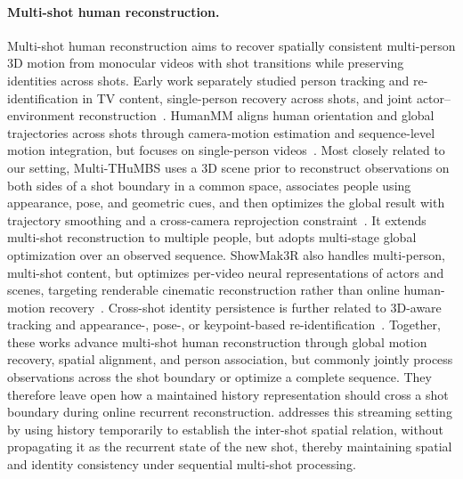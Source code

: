 \paragraph{Multi-shot human reconstruction.}
Multi-shot human reconstruction aims to recover spatially consistent
multi-person 3D motion from monocular videos with shot transitions while
preserving identities across shots. Early work separately studied person
tracking and re-identification in TV content, single-person recovery across
shots, and joint actor--environment
reconstruction~\citep{pavlakos2022tvtracking,pavlakos2022multishot,pavlakos2022tvreconstruction}.
HumanMM aligns human orientation and global trajectories across shots through
camera-motion estimation and sequence-level motion integration, but focuses on
single-person videos~\citep{zhang2025humanmm}. Most closely related to our
setting, Multi-THuMBS uses a 3D scene prior to reconstruct observations on both
sides of a shot boundary in a common space, associates people using
appearance, pose, and geometric cues, and then optimizes the global result with
trajectory smoothing and a cross-camera reprojection
constraint~\citep{on2026multithumbs}. It extends multi-shot reconstruction to
multiple people, but adopts multi-stage global optimization over an observed
sequence. ShowMak3R also handles multi-person, multi-shot content, but
optimizes per-video neural representations of actors and scenes, targeting
renderable cinematic reconstruction rather than online human-motion
recovery~\citep{kim2025showmak3r}. Cross-shot identity persistence is further
related to 3D-aware tracking and appearance-, pose-, or keypoint-based
re-identification~\citep{rajasegaran2022phalp,he2021transreid,yuan2025pose2id,somers2024kpr}.
Together, these works advance multi-shot human reconstruction through global
motion recovery, spatial alignment, and person association, but commonly
jointly process observations across the shot boundary or optimize a complete
sequence. They therefore leave open how a maintained history representation
should cross a shot boundary during online recurrent reconstruction. \method{}
addresses this streaming setting by using history temporarily to establish the
inter-shot spatial relation, without propagating it as the recurrent state of
the new shot, thereby maintaining spatial and identity consistency under
sequential multi-shot processing.
